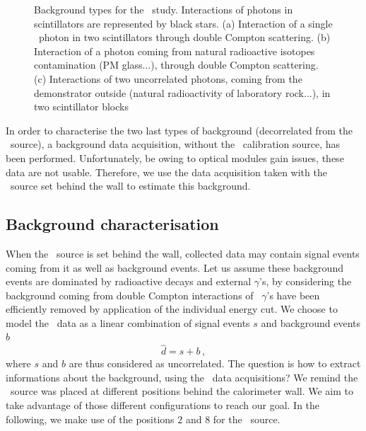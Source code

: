 \begin{figure}[h]
\begin{subfigure}[t]{0.30\textwidth}
    \captionsetup{justification=justified}
    \caption{
      \label{subfig:Co_bkg_3}}
  \end{subfigure}
  \caption{Background types for the \Co\ study.
    Interactions of photons in scintillators are represented by black stars.
    (a) Interaction of a single \Co\ photon in two scintillators through double Compton scattering.
    (b) Interaction of a photon coming from natural radioactive isotopes contamination (PM glass...), through double Compton scattering.
    (c) Interactions of two uncorrelated photons, coming from the demonstrator outside (natural radioactivity of laboratory rock...), in two scintillator blocks
    \label{fig:Co_bkg}}
\end{figure}
In order to characterise the two last types of background (decorrelated from the \Co\ source), a background data acquisition, without the \Co\ calibration source, has been performed.
Unfortunately, be owing to optical modules gain issues, these data are not usable.
Therefore, we use the data acquisition taken with the \Co\ source set behind the wall to estimate this background.

\subsection{Background characterisation}

When the \Co\ source is set behind the wall, collected data may contain signal events coming from it as well as background events.
Let us assume these background events are dominated by radioactive decays and external $\gamma$'s, by considering the background coming from double Compton interactions of \Co\ $\gamma$'s have been efficiently removed by application of the individual energy cut.
We choose to model the \Co\ data as a linear combination of signal events $s$ and background events $b$
\begin{equation}
  \hat{d}=s+b\,,
  \label{eq:estimation_data}
\end{equation}
where $s$ and $b$ are thus considered as uncorrelated.
The question is how to extract informations about the background, using the \Co\ data acquisitions?
We remind the \Co\ source was placed at different positions behind the calorimeter wall.
We aim to take advantage of those different configurations to reach our goal.
In the following, we make use of the positions $2$ and $8$ for the \Co\ source.

